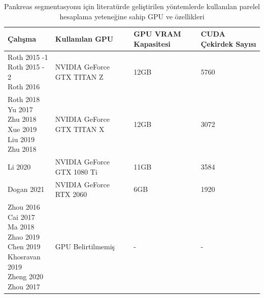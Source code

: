 \begin{table}[h!]
	\centering
	\caption{Pankreas segmentasyonu için literatürde geliştirilen yöntemlerde kullanılan parelel hesaplama yeteneğine sahip GPU ve özellikleri}
	\label{tab:gpus}
	\begin{adjustbox}{width=\textwidth}
        \begin{tabular}{lm{8cm}m{2cm}m{2cm}}
        \toprule
        Çalışma & Kullanılan GPU & GPU VRAM Kapasitesi& CUDA Çekirdek Sayısı \\
        \midrule
        \pbox{10cm}{Roth 2015 -1 \cite{roth2015deep} 
        \\ Roth 2015 - 2 \cite{roth2015deeporgan} 
        \\ Roth 2016 \cite{roth2016spatial}} 
        & NVIDIA GeForce GTX TITAN Z & 12GB & 5760       \\
        \midrule
        \pbox{10cm}{Roth 2018 \cite{roth2018spatial} 
        \\ Yu 2017 \cite{yu2018recurrent} 
        \\ Zhu 2018 \cite{zhu20183d}
        \\ Xue 2019 \cite{xue2019cascaded}
        \\ Liu 2019 \cite{liu2019automatic}
        \\ Zhu 2018 \cite{zhu20183d}}
        & NVIDIA GeForce GTX TITAN X & 12GB & 3072       \\
        \midrule
        Li 2020 \cite{li2020model} & NVIDIA GeForce GTX 1080 Ti & 11GB & 3584       \\
        \midrule
        \rowcolor{Gray}
        Dogan 2021 \cite{dogan2021two} & NVIDIA GeForce RTX 2060    & 6GB  & 1920      \\
        \midrule
        \pbox{10cm}{Zhou 2016 \cite{zhou2016pancreas} 
        \\ Cai 2017 \cite{cai2017improving} 
        \\ Ma 2018 \cite{ma2018novel}
        \\ Zhao 2019 \cite{zhao2019fully}
        \\ Chen 2019 \cite{chen2019harnessing}
        \\ Khosravan 2019 \cite{khosravan2019pan}
        \\ Zheng 2020 \cite{zheng2020deep}
        \\ Zhou 2017 \cite{zhou2017deep}}
        & GPU Belirtilmemiş    & -  & -      \\
        \bottomrule
        \end{tabular}
    \end{adjustbox}
\end{table}

